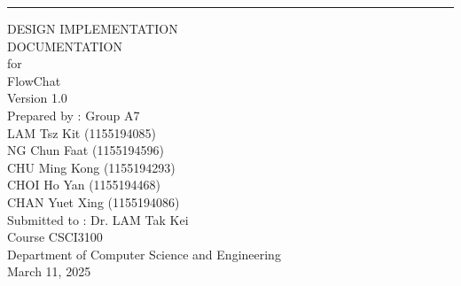 \documentclass[11pt, a4paper]{article}
\def\myversion{1.0}
\def\submitdate{March 11, 2025}
\begin{document}
\begin{flushright}
    \rule{16cm}{2pt}\vskip1cm

        DESIGN IMPLEMENTATION\\ DOCUMENTATION\\
        \vspace{1cm}
        for\\
        \vspace{1cm}
        FlowChat\\
        \vspace{1cm}
        {Version \myversion}\\
        \vspace{1cm}
        Prepared by :  Group A7\\
        \vspace{0.5cm}
        LAM Tsz Kit (1155194085)\\
        NG Chun Faat (1155194596)\\
        CHU Ming Kong (1155194293)\\
        CHOI Ho Yan (1155194468)\\
        CHAN Yuet Xing (1155194086)\\
        \vspace{1cm}
        Submitted to : Dr. LAM Tak Kei\\
        \vspace{1cm}
        Course CSCI3100\\
        Department of Computer Science and Engineering\\
        \vspace{1.cm}
        \submitdate

\end{flushright}

\newpage
\tableofcontents

\bigskip
\end{document}
